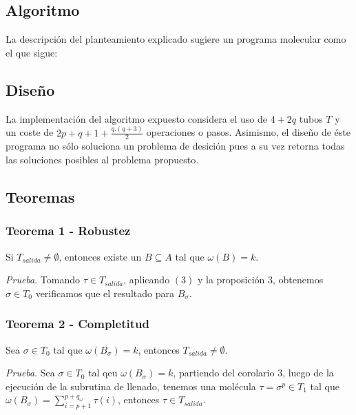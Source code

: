 \documentclass[12pt, letterpaper, twoside]{article}
\begin{document}
    \subsection{Algoritmo}
    La descripción del planteamiento explicado sugiere un programa molecular como el que sigue:
    \begin{algorithm}
        \begin{algorithmic}[1]
            \EndProcedure
        \end{algorithmic}
    \end{algorithm}

    \subsection{Diseño}

    La implementación del algoritmo expuesto considera el uso de $4+2q$ tubos $T$ y un coste de $2p+q+1+\frac{q.(q+3)}{2}$ operaciones o pasos. Asimismo, el diseño de éste programa no sólo soluciona un problema de desición pues a su vez retorna todas las soluciones posibles al problema propuesto.

    \subsection{Teoremas}
    \subsubsection{Teorema 1 - Robustez}
    Si $T_{salida}\neq\emptyset$, entonces existe un $B\subseteq{A}$ tal que $\omega(B)=k$.

    \emph{Prueba}. Tomando $\tau\in{T_{salida}}$, aplicando $(3)$ y la proposición 3, obtenemos $\sigma\in{T_0}$ verificamos que el resultado para $B_\sigma$.

    \subsubsection{Teorema 2 - Completitud}
    Sea $\sigma\in{T_0}$ tal que $\omega(B_\sigma)=k$, entonces $T_{salida}\neq\emptyset$.

    \emph{Prueba}. Sea $\sigma\in{T_0}$ tal qeu $\omega(B_\sigma)=k$, partiendo del corolario 3, luego de la ejecución de la subrutina de llenado, tenemos una molécula $\tau=\sigma^{p}\in{T_1}$ tal que $\omega(B_\sigma)=\sum^{p+q_\omega}_{i=p+1}\tau(i)$, entonces $\tau\in{T_{salida}}$.
\end{document}
